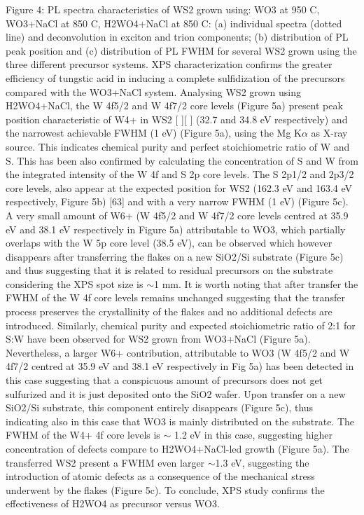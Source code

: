 \documentclass[12pt]{article}
\begin{document}
Figure 4: PL spectra characteristics of WS2 grown using: WO3 at 950 {\degree}C, WO3+NaCl at 850 {\degree}C, H2WO4+NaCl at 850 {\degree}C: (a) individual spectra (dotted line) and deconvolution in exciton and trion components; (b) distribution of PL peak position and (c) distribution of PL FWHM for several WS2 grown using the three different precursor systems.
XPS characterization confirms the greater efficiency of tungstic acid in inducing a complete sulfidization of the precursors compared with the WO3+NaCl system. Analysing WS2 grown using H2WO4+NaCl, the W 4f5/2 and W 4f7/2 core levels (Figure 5a) present peak position characteristic of W4+ in WS2 [ ][ ] (32.7 and 34.8 eV respectively) and the narrowest achievable FWHM (1 eV) (Figure 5a), using the Mg K$\alpha$ as X-ray source. This indicates chemical purity and perfect stoichiometric ratio of W and S. This has been also confirmed by calculating the concentration of S and W from the integrated intensity of the W 4f and S 2p core levels. The S 2p1/2 and 2p3/2 core levels, also appear at the expected position for WS2 (162.3 eV and 163.4 eV respectively, Figure 5b) [63] and with a very narrow FWHM (1 eV) (Figure 5c). A very small amount of W6+ (W 4f5/2 and W 4f7/2 core levels centred at 35.9 eV and 38.1 eV respectively in Figure 5a) attributable to WO3, which partially overlaps with the W 5p core level (38.5 eV), can be observed which however disappears after transferring the flakes on a new SiO2/Si substrate (Figure 5c) and thus suggesting that it is related to residual precursors on the substrate considering the XPS spot size is {$\sim$}1 mm. It is worth noting that after transfer the FWHM of the W 4f core levels remains unchanged suggesting that the transfer process preserves the crystallinity of the flakes and no additional defects are introduced.
Similarly, chemical purity and expected stoichiometric ratio of 2:1 for S:W have been observed for WS2 grown from WO3+NaCl (Figure 5a). Nevertheless, a larger W6+ contribution, attributable to WO3  (W 4f5/2 and W 4f7/2 centred at 35.9 eV and 38.1 eV respectively in Fig 5a) has been detected in this case suggesting that a conspicuous amount of precursors does not get sulfurized and it is just deposited onto the SiO2 wafer. Upon transfer on a new SiO2/Si substrate, this component entirely disappears (Figure 5c), thus indicating also in this case that WO3 is mainly distributed on the substrate. The FWHM of the W4+ 4f core levels is {$\sim$} 1.2 eV in this case, suggesting higher concentration of defects compare to H2WO4+NaCl-led growth (Figure 5a). The transferred WS2 present a FWHM even larger {$\sim$}1.3 eV, suggesting the introduction of atomic defects as a consequence of the mechanical stress underwent by the flakes (Figure 5c). To conclude, XPS study confirms the effectiveness of H2WO4 as precursor versus WO3.
 
\end{document}
